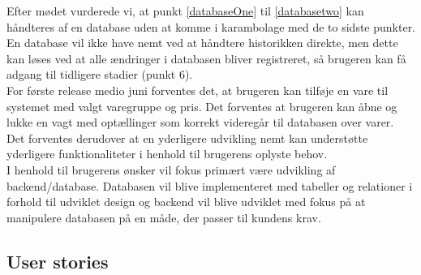 \documentclass[]{article}
\begin{document}
\noindent Efter mødet vurderede vi, at punkt \ref{databaseOne} til \ref{databasetwo} kan håndteres af en database uden at komme i karambolage med de to sidste punkter. En database vil ikke have nemt ved at håndtere historikken direkte, men dette kan løses ved at alle ændringer i databasen bliver registreret, så brugeren kan få adgang til tidligere stadier (punkt 6). \\
\indent For første release medio juni forventes det, at brugeren kan tilføje en vare til systemet med valgt varegruppe og pris. Det forventes at brugeren kan åbne og lukke en vagt med optællinger som korrekt videregår til databasen over varer. Det forventes derudover at en yderligere udvikling nemt kan understøtte yderligere funktionaliteter i henhold til brugerens oplyste behov. \\
\indent I henhold til brugerens ønsker vil fokus primært være udvikling af backend/database. Databasen vil blive implementeret med tabeller og relationer i forhold til udviklet design og backend vil blive udviklet med fokus på at manipulere databasen på en måde, der passer til kundens krav.

\subsection{User stories}
\end{document}
